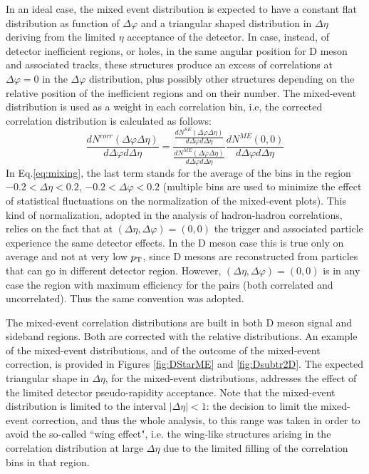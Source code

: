 In an ideal case, the mixed event distribution is expected to have a constant flat distribution as function of $\Delta\varphi$ and a triangular shaped distribution in $\Delta\eta$
deriving from the limited $\eta$ acceptance of the detector. In case, instead, of detector inefficient regions, or holes, in the same angular position for D meson and associated tracks, these structures produce an excess of correlations at $\Delta\varphi=0$ in the $\Delta\varphi$ distribution, plus possibly other structures depending on the relative position of the inefficient regions and on their number. The mixed-event distribution is used as a weight in each correlation bin, i.e, the corrected correlation distribution is calculated as follows:
\begin{equation}
\label{eq:mixing}
\frac{dN^{corr}\left(\Delta\varphi \Delta\eta\right)}{d\Delta\varphi d\Delta\eta} = \frac{\frac{dN^{SE}\left(\Delta\varphi \Delta\eta\right)}{d\Delta\varphi d\Delta\eta} }{\frac{dN^{ME}\left(\Delta\varphi \Delta\eta\right)}{d\Delta\varphi d\Delta\eta} }\frac{dN^{ME}\left(0,  0\right)}{d\Delta\varphi d\Delta\eta}
\end{equation}
In Eq.\ref{eq:mixing}, the last term stands for the average of the bins in the region $-0.2 < \Delta\eta < 0.2$, $-0.2 < \Delta\varphi < 0.2$ (multiple bins are used to minimize the effect of statistical fluctuations on the normalization of the mixed-event plots).
This kind of normalization, adopted in the analysis of hadron-hadron correlations, relies on the fact that at $(\Delta\eta,\Delta\varphi)=(0,0)$ the trigger and associated particle experience the same detector effects. In the D meson case this is true only on average and not at very low $p_{\rm T}$, since D mesons are reconstructed from particles that can go
in different detector region. However, $(\Delta\eta,\Delta\varphi)=(0,0)$ is in any case
the region with maximum efficiency for the pairs (both correlated and uncorrelated). Thus the same convention was adopted.

The mixed-event correlation distributions are built in both D meson signal and sideband regions. Both are
corrected with the relative distributions. An example of the mixed-event distributions, and of the outcome of the mixed-event correction, is provided in Figures \ref{fig:DStarME} and \ref{fig:Dsubtr2D}. The expected triangular shape in $\Delta\eta$, for the mixed-event distributions, addresses the effect of the limited detector pseudo-rapidity acceptance. Note that the mixed-event distribution is limited to the interval $\left|\Delta\eta\right|<1$: the decision to limit the mixed-event correction, and thus the whole analysis, to this range was taken in order to avoid the so-called ``wing effect", i.e. the wing-like structures arising in the correlation distribution at large $\Delta\eta$ due to the limited filling of the correlation bins in that region. %

